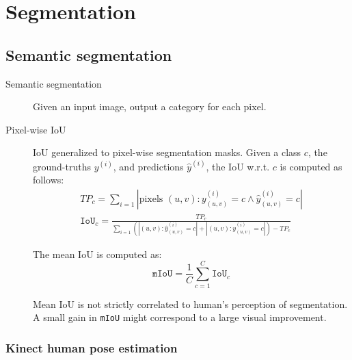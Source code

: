 \chapter{Segmentation}


\section{Semantic segmentation}

\begin{description}
    \item[Semantic segmentation] 
        Given an input image, output a category for each pixel.

    \item[Pixel-wise IoU] 
        IoU generalized to pixel-wise segmentation masks. Given a class $c$, the ground-truths $y^{(i)}$, and predictions $\hat{y}^{(i)}$, the IoU w.r.t. $c$ is computed as follows:
        \[
            \begin{gathered}
                TP_c = \sum_{i=1} | \text{pixels $(u, v): y_{(u, v)}^{(i)} = c \land \hat{y}_{(u, v)}^{(i)} = c$} | \\
                \texttt{IoU}_c = \frac{TP_c}{\sum_{i=1} \left( | (u, v): \hat{y}_{(u, v)}^{(i)} = c | + | (u, v): y_{(u, v)}^{(i)} = c | \right) - TP_c}
            \end{gathered}
        \]

        The mean IoU is computed as:
        \[ \texttt{mIoU} = \frac{1}{C} \sum_{c=1}^{C} \texttt{IoU}_c \]


        \begin{remark}
            Mean IoU is not strictly correlated to human's perception of segmentation. A small gain in \texttt{mIoU} might correspond to a large visual improvement.
        \end{remark}
\end{description}


\subsection{Kinect human pose estimation}

